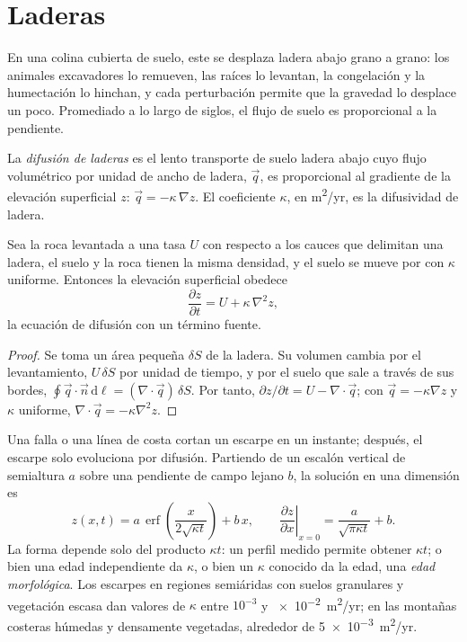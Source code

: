 \section{Laderas}\label{sec:b3:quantitative-geomorphology:hillslopes}

En una colina cubierta de suelo, este se desplaza ladera abajo grano a grano: los animales excavadores lo remueven,
las raíces lo levantan, la congelación y la humectación lo hinchan, y cada
perturbación permite que la gravedad lo desplace un poco. Promediado a lo largo de siglos, el
flujo de suelo es proporcional a la pendiente.

\begin{definition}\label{def:b3:quantitative-geomorphology:diffusion}
La \emph{difusión de laderas} es el lento
transporte de suelo ladera abajo cuyo flujo volumétrico por unidad de ancho de ladera,
$\vec q$, es proporcional al gradiente de la elevación superficial $z$:
$\vec q = -\kappa\,\nabla z$. El coeficiente $\kappa$, en
\unit{m^2/yr}, es la difusividad de ladera.
\end{definition}

\begin{theorem}\label{thm:b3:quantitative-geomorphology:diffusion}
Sea la roca levantada a una tasa $U$ con respecto a los cauces que delimitan una
ladera, el suelo y la roca tienen la misma densidad, y el suelo se mueve por 
con $\kappa$ uniforme. Entonces la elevación superficial obedece
\[
\frac{\partial z}{\partial t} = U + \kappa\,\nabla^2 z ,
\]
la ecuación de difusión con un término fuente.
\end{theorem}

\begin{proof}
Se toma un área pequeña $\delta S$ de la ladera. Su volumen cambia por el levantamiento,
$U\,\delta S$ por unidad de tiempo, y por el suelo que sale a través de sus
bordes, $\oint \vec q\cdot\vec n\,\mathrm{d}\ell = (\nabla\cdot\vec q)\,\delta S$.
Por tanto, $\partial z/\partial t = U - \nabla\cdot\vec q$; con $\vec q = -\kappa
\nabla z$ y $\kappa$ uniforme, $\nabla\cdot\vec q = -\kappa\nabla^2 z$.
\end{proof}

Una falla o una línea de costa cortan un escarpe en un instante; después, el escarpe solo
evoluciona por difusión. Partiendo de un escalón vertical de semialtura $a$ sobre una
pendiente de campo lejano $b$, la solución en una dimensión es
\[
z(x,t) = a\,\operatorname{erf}\!\left(\frac{x}{2\sqrt{\kappa t}}\right) + b\,x ,
\qquad
\left.\frac{\partial z}{\partial x}\right|_{x=0} = \frac{a}{\sqrt{\pi\kappa t}} + b .
\]
La forma depende solo del producto $\kappa t$: un perfil medido permite obtener
$\kappa t$; o bien una edad independiente da $\kappa$, o bien
un $\kappa$ conocido da la edad, una \emph{edad morfológica}. Los escarpes en regiones semiáridas
con suelos granulares y vegetación escasa dan valores de $\kappa$ entre
$10^{-3}$ y \qty{e-2}{m^2/yr}; en las montañas costeras húmedas y densamente
vegetadas, alrededor de \qty{5e-3}{m^2/yr}.

